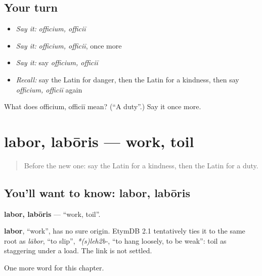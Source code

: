 \subsection*{Your turn}
\begin{itemize}
\raggedright
  \item \emph{Say it:} \emph{officium, officiī}
  \item \emph{Say it:} \emph{officium, officiī}, once more
  \item \emph{Say it:} say \emph{officium, officiī}
  \item \emph{Recall:} say the Latin for danger, then the Latin for a kindness, then say \emph{officium, officiī} again
\end{itemize}

\begin{tcolorbox}[breakable,colback=teal!4,colframe=teal!35!black,title={Before you move on}]
What does officium, officiī mean? (\textquotedblleft{}A duty\textquotedblright{}.) Say it once more.
\end{tcolorbox}
\section[labor, labōris]{labor, labōris — work, toil}

\label{lesson:LA-C248-labor2}



\begin{quote}
Before the new one: say the Latin for a kindness, then the Latin for a duty.
\end{quote}

\subsection*{You'll want to know: labor, labōris}
\textbf{labor, labōris} — \textquotedblleft{}work, toil\textquotedblright{}.

\begin{cousinweb}
\textbf{labor}, \textquotedblleft{}work\textquotedblright{}, has no sure origin. EtymDB 2.1 tentatively ties it to the same root as \emph{lābor}, \textquotedblleft{}to slip\textquotedblright{}, \emph{*(s)leh2b-}, \textquotedblleft{}to hang loosely, to be weak\textquotedblright{}: toil as staggering under a load. The link is not settled.
\end{cousinweb}

\begin{grammarlens}[title={What you've built}]
One more word for this chapter.
\end{grammarlens}

